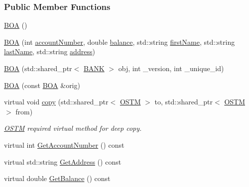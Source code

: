\subsubsection*{Public Member Functions}
\begin{DoxyCompactItemize}
\item 
\hyperlink{class_b_o_a_ad42dc670d422172c9bcf9b3d354c8a3c_ad42dc670d422172c9bcf9b3d354c8a3c}{B\+OA} ()
\item 
\hyperlink{class_b_o_a_a898c8627b8976bbe1a7d0fc780642b25_a898c8627b8976bbe1a7d0fc780642b25}{B\+OA} (int \hyperlink{class_b_o_a_a86ca4ad716db205f04c337b39b34d9ba_a86ca4ad716db205f04c337b39b34d9ba}{account\+Number}, double \hyperlink{class_b_o_a_a2061c36a15924de9186ec5c83dc7da2f_a2061c36a15924de9186ec5c83dc7da2f}{balance}, std\+::string \hyperlink{class_b_o_a_acb1b3b2a69e403c4e0e3fb08fdbb52a0_acb1b3b2a69e403c4e0e3fb08fdbb52a0}{first\+Name}, std\+::string \hyperlink{class_b_o_a_ab7749e6e945beaca57a3ef01259c6fea_ab7749e6e945beaca57a3ef01259c6fea}{last\+Name}, std\+::string \hyperlink{class_b_o_a_afb2d7d0c5c05169a72bbc6f1d2cc737f_afb2d7d0c5c05169a72bbc6f1d2cc737f}{address})
\item 
\hyperlink{class_b_o_a_ab87192ed986e601c2eb682ea3745daf0_ab87192ed986e601c2eb682ea3745daf0}{B\+OA} (std\+::shared\+\_\+ptr$<$ \hyperlink{class_b_a_n_k}{B\+A\+NK} $>$ obj, int \+\_\+version, int \+\_\+unique\+\_\+id)
\item 
\hyperlink{class_b_o_a_a99ebf22a8d824761dc82e7e191e6f173_a99ebf22a8d824761dc82e7e191e6f173}{B\+OA} (const \hyperlink{class_b_o_a}{B\+OA} \&orig)
\item 
virtual void \hyperlink{class_b_o_a_a54fbcabb55b22fb72f45986768974403_a54fbcabb55b22fb72f45986768974403}{copy} (std\+::shared\+\_\+ptr$<$ \hyperlink{class_o_s_t_m}{O\+S\+TM} $>$ to, std\+::shared\+\_\+ptr$<$ \hyperlink{class_o_s_t_m}{O\+S\+TM} $>$ from)
\begin{DoxyCompactList}\small\item\em \hyperlink{class_o_s_t_m}{O\+S\+TM} required virtual method for deep copy. \end{DoxyCompactList}\item 
virtual int \hyperlink{class_b_o_a_ad64bd63675f8902153aa6767994f05dc_ad64bd63675f8902153aa6767994f05dc}{Get\+Account\+Number} () const 
\item 
virtual std\+::string \hyperlink{class_b_o_a_aa4aa2cf1ef0e876bb7911c00b5374493_aa4aa2cf1ef0e876bb7911c00b5374493}{Get\+Address} () const 
\item 
virtual double \hyperlink{class_b_o_a_a07e30b7e5f5f20392b94af7344fd550c_a07e30b7e5f5f20392b94af7344fd550c}{Get\+Balance} () const 

\end{DoxyCompactItemize}
